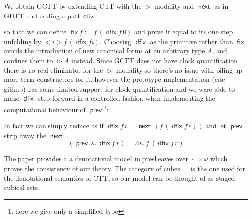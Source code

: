 \documentclass{book}
\DeclareMathOperator{\fix}{\mathsf{fix}}
\DeclareMathOperator{\Later}{\vartriangleright}
\DeclareMathOperator{\dfix}{\mathsf{dfix}}
\DeclareMathOperator{\prev}{\mathsf{prev}}
\DeclareMathOperator{\next}{\ensuremath{\mathsf{next}}}
\DeclareMathOperator{\Cube}{\square}
\newcommand{\sd}{.\,}
\begin{document}
  We obtain GCTT by extending CTT with the $\Later$ modality and $\next$ as in GDTT and adding a path $\mathsf{dfix}$
  so that we can define $\fix f := f\,(\dfix f\,0)$ and prove it
  equal to its one step unfolding by $<i> f\,(\dfix f i)$.
  Choosing $\dfix$ as the primitive rather than $\fix$ avoids the
  introduction of new canonical forms at an arbitrary type $A$, and
  confines them to $\Later A$ instead.
  Since GCTT does not have clock quantification there is no real
  eliminator for the $\Later$ modality so there's no issue with piling
  up more term constructors for it, however the prototype
  implementation (cite github) has some limited support for clock
  quantification and we were able to make $\dfix$ step forward in a
  controlled fashion when implementing the computational behaviour of
  $\prev$\footnote{here we give only a simplified type}:
  In fact we can simply reduce as if $\dfix f\,r = \next\,(f\,(\dfix f\,r))$ and let $\prev$ strip away the $\next$.
  \[
    (\prev\,\kappa\sd \dfix f\,r) = \Lambda \kappa\sd f\,(\dfix f\,r)
  \]

  The paper provides a a denotational model in presheaves over $\Cube
  \times \omega$ which proves the consistency of our theory.
  The category of cubes $\Cube$ is the one used for the denotational
  semantics of CTT, so our model can be thought of as staged cubical sets.
\end{document}
